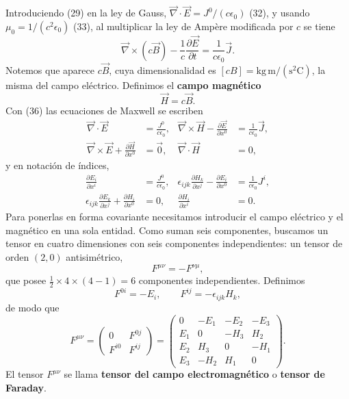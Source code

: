 Introduciendo (29) en la ley de Gauss, $\vec\nabla\cdot\vec E=J^0/(c
\epsilon_0)$ (32), y usando $\mu_0=1/(c^2\epsilon_0)$ (33), al multiplicar
la ley de Ampère modificada por $c$ se tiene
\[
\vec\nabla\times(c\vec B)-\frac1c\frac{\partial\vec E}{\partial t} =
\frac{1}{c\epsilon_0}\vec J . \tag{35}
\]
Notemos que aparece $c\vec B$, cuya dimensionalidad es
$[cB]=\text{kg}\,\text{m}/(\text{s}^2\text{C})$, la misma del campo
eléctrico. Definimos el \textbf{campo magnético}
\[
\vec H = c\vec B . \tag{36}
\]
Con (36) las ecuaciones de Maxwell se escriben
\[
\begin{aligned}
\vec\nabla\cdot\vec E &= \frac{J^0}{c\epsilon_0}, &
\vec\nabla\times\vec H-\frac{\partial\vec E}{\partial x^0} &=
\frac{1}{c\epsilon_0}\vec J,\\
\vec\nabla\times\vec E+\frac{\partial\vec H}{\partial x^0} &= \vec0, &
\vec\nabla\cdot\vec H &= 0,
\end{aligned} \tag{37}
\]
y en notación de índices,
\[
\begin{aligned}
\frac{\partial E_i}{\partial x^i} &= \frac{J^0}{c\epsilon_0}, &
\epsilon_{ijk}\frac{\partial H_k}{\partial x^j}-\frac{\partial E_i}
{\partial x^0} &= \frac{1}{c\epsilon_0}J^i,\\
\epsilon_{ijk}\frac{\partial E_k}{\partial x^j}+\frac{\partial H_i}
{\partial x^0} &= 0, & \frac{\partial H_i}{\partial x^i} &= 0.
\end{aligned} \tag{38}
\]
Para ponerlas en forma covariante necesitamos introducir el campo
eléctrico y el magnético en una sola entidad. Como suman seis
componentes, buscamos un tensor en cuatro dimensiones con seis
componentes independientes: un tensor de orden $(2,0)$ antisimétrico,
\[
F^{\mu\nu}=-F^{\nu\mu}, \tag{39}
\]
que posee $\frac12\times4\times(4-1)=6$ componentes independientes.
Definimos
\[
F^{0i}=-E_i, \qquad F^{ij}=-\epsilon_{ijk}H_k, \tag{40}
\]
de modo que
\[
F^{\mu\nu} = \begin{pmatrix} 0 & F^{0j}\\ F^{i0} & F^{ij}\end{pmatrix}
= \begin{pmatrix} 0 & -E_1 & -E_2 & -E_3\\ E_1 & 0 & -H_3 & H_2\\
E_2 & H_3 & 0 & -H_1\\ E_3 & -H_2 & H_1 & 0\end{pmatrix}. \tag{41, 42}
\]
El tensor $F^{\mu\nu}$ se llama \textbf{tensor del campo
electromagnético} o \textbf{tensor de Faraday}.

